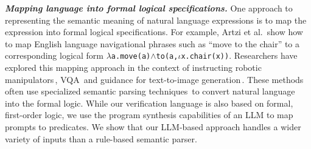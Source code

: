 \vspace{0.5em}
\noindent
{\bf \em Mapping language into formal logical specifications.}
One approach to representing the semantic meaning of natural language
expressions is to map the expression into formal logical
specifications.  For example, Artzi et
al.\, show how to map English language
navigational phrases such as 
``move to the chair'' to a
corresponding logical form \texttt{$\lambda$a.move(a)$\land$to(a,$\iota$x.chair(x))}.
Researchers have explored this mapping approach in the
context of instructing robotic
manipulators\,\cite{wang2023programmatically}, 
VQA\,\cite{hsu2024left} and guidance for text-to-image
generation\,\cite{sueyoshi2024predicated}.
%
These methods often use specialized semantic parsing
techniques\,\cite{kamath2018survey} to convert natural language into
the formal logic.
%
While our \dslname{} verification language is also based on
formal, first-order logic, we use the program synthesis capabilities of
an LLM to map prompts to \dslname{} predicates. We show that our
LLM-based approach handles a wider variety of inputs than a rule-based
semantic parser.




